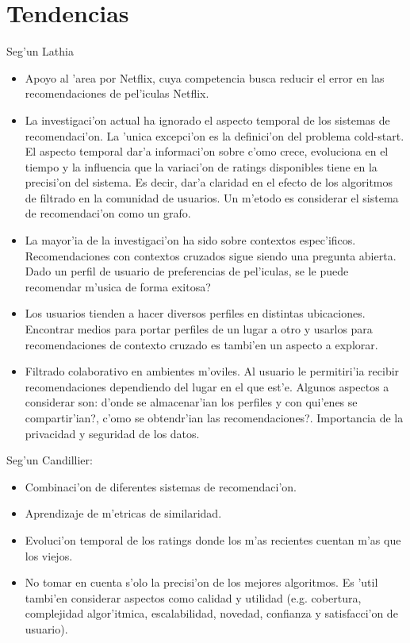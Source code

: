 \documentclass[11pt]{article}
\begin{document}
\section{Tendencias}
Seg'un Lathia\\
\begin{itemize}
\item Apoyo al 'area por Netflix, cuya competencia busca reducir el error en las recomendaciones de pel'iculas Netflix.
\item La investigaci'on actual ha ignorado el aspecto temporal de los sistemas de recomendaci'on. La 'unica excepci'on es la definici'on del problema cold-start. El aspecto temporal dar'a informaci'on sobre c'omo crece, evoluciona en el tiempo y la influencia que la variaci'on de ratings disponibles tiene en la precisi'on del sistema. Es decir, dar'a claridad en el efecto de los algoritmos de filtrado en la comunidad de usuarios. Un m'etodo es considerar el sistema de recomendaci'on como un grafo.
\item La mayor'ia de la investigaci'on ha sido sobre contextos espec'ificos. Recomendaciones con contextos cruzados sigue siendo una pregunta abierta. Dado un perfil de usuario de preferencias de pel'iculas, se le puede recomendar m'usica de forma exitosa?
\item Los usuarios tienden a hacer diversos perfiles en distintas ubicaciones. Encontrar medios para portar perfiles de un lugar a otro y usarlos para recomendaciones de contexto cruzado es tambi'en un aspecto a explorar.
\item Filtrado colaborativo en ambientes m'oviles. Al usuario le permitiri'ia recibir recomendaciones dependiendo del lugar en el que est'e. Algunos aspectos a considerar son: \textquestiondown d'onde se almacenar'ian los perfiles y con qui'enes se compartir'ian?, \textquestiondown c'omo se obtendr'ian las recomendaciones?. Importancia de la privacidad y seguridad de los datos.
\end{itemize}

Seg'un Candillier:
\begin{itemize}
\item Combinaci'on de diferentes sistemas de recomendaci'on.
\item Aprendizaje de m'etricas de similaridad.
\item Evoluci'on temporal de los ratings donde los m'as recientes cuentan m'as que los viejos.
\item No tomar en cuenta s'olo la precisi'on de los mejores algoritmos. Es 'util tambi'en considerar aspectos como calidad y utilidad (e.g. cobertura, complejidad algor'itmica, escalabilidad, novedad, confianza y satisfacci'on de usuario).
\end{itemize}
\end{document}
